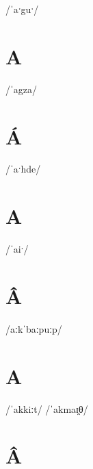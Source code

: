 \documentclass[10pt,a4paper,twoside]{book}
\begin{document}
\begin{multicols}{3}
 {/ˈaˑguˑ/} {}
\end{multicols}

\section*{A}

\begin{multicols}{3}
 {/ˈagza/} {}
\end{multicols}

\section*{Á}

\begin{multicols}{3}
 {/ˈaˑhde/} {}
\end{multicols}

\section*{A}

\begin{multicols}{3}
 {/ˈaiˑ/} {}
\end{multicols}

\section*{Â}

\begin{multicols}{3}
 {/aːkˈbaːpuːp/} {}
\end{multicols}

\section*{A}

\begin{multicols}{3}
 {/ˈakkiːt/} {}
 {/ˈakmaɪ̯θ/} {}
\end{multicols}

\section*{Â}
\end{document}
